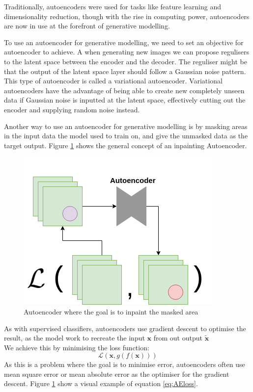 Traditionally, autoencoders were used for tasks like feature learning and dimensionality reduction, though with the rise in computing power, autoencoders are now in use at the forefront of generative modelling.


To use an autoencoder for generative modelling, we need to set an objective for autoencoder to achieve.
A when generating new images we can propose regulisers to the latent space between the encoder and the decoder. The reguliser might be that the output of the latent space layer should follow a Gaussian noise pattern. 
This type of autoencoder is called a variational autoencoder. Variational autoencoders have the advantage of being able to create new completely unseen data if Gaussian noise is inputted at the latent space, effectively cutting out the encoder and supplying random noise instead.



Another way to use an autoencoder for generative modelling is by masking areas in the input data the model used to train on, and give the unmasked data as the target output.
Figure \ref{fig:AEinpainting} shows the general concept of an inpainting Autoencoder.



\begin{figure}
    \centering
    \includegraphics[scale=0.6]{background/figures/AE_for_inpainting.png}
    \caption{Autoencoder where the goal is to inpaint the masked area}
    \label{fig:AEinpainting}
\end{figure}



As with supervised classifiers, autoencoders use gradient descent to optimise  the result, as the model work to recreate the input $\textbf{x}$ from out output $\widetilde{\textbf{x}}$\\    
We achieve this by minimising the loss function:\\
\begin{equation}
    \mathcal{L}(\textbf{x},g(f(\textbf{x})))
    \label{eq:AEloss}
\end{equation}
As this is a problem where the goal is to minimise error, autoencoders often use mean square error or mean absolute error as the optimiser for the gradient descent. 
Figure \ref{fig:AEinpainting} show a visual example of equation \ref{eq:AEloss}.


